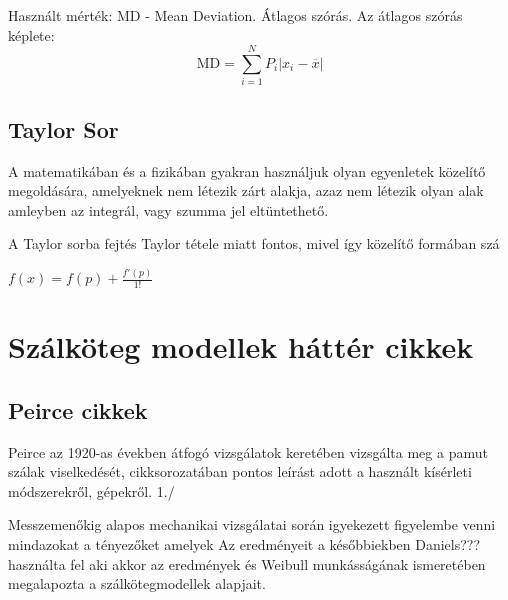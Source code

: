 Használt mérték: MD - Mean Deviation. Átlagos szórás. Az átlagos szórás képlete:
\begin{equation}
	\text{MD}=\sum\limits_{i=1}^{N}P_i\vert x_i-\overline{x}\vert
\end{equation}

\subsection{Taylor Sor}
A matematikában és a fizikában gyakran használjuk olyan egyenletek közelítő megoldására, amelyeknek nem létezik zárt alakja, azaz nem létezik olyan alak amleyben az integrál, vagy szumma jel eltüntethető. 

A Taylor sorba fejtés Taylor tétele miatt fontos, mivel így közelítő formában szá

$f(x)=f(p)+\frac{f'(p)}{1!}$

\section{Szálköteg modellek háttér cikkek}
\subsection{Peirce cikkek}
Peirce az 1920-as években átfogó vizsgálatok keretében vizsgálta meg a pamut szálak viselkedését, cikksorozatában pontos leírást adott a használt kísérleti módszerekről, gépekről. 
1./

Messzemenőkig alapos mechanikai vizsgálatai során igyekezett figyelembe venni mindazokat a tényezőket amelyek   Az eredményeit a későbbiekben Daniels??? használta fel aki akkor az eredmények és Weibull munkásságának ismeretében 
megalapozta a szálkötegmodellek alapjait.


